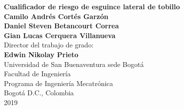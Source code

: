 \begin{center}
\thispagestyle{empty} \vspace*{0cm} \textbf{\huge
Cualificador de riesgo de esguince lateral de tobillo}\\[2.5cm]
\vspace*{1cm}
\Large\textbf{Camilo Andrés Cortés Garzón \\ Daniel Steven Betancourt Correa \\ Gian Lucas Cerquera Villanueva}\\[3.5cm]
\large{Director del trabajo de grado:}\\%
\large\textbf{Edwin Nikolay Prieto}\\[1.5cm]



\vspace*{2.5cm}
\Large{Universidad de San Buenaventura sede Bogotá}\\
\Large{Facultad de Ingeniería}\\
\Large{Programa de Ingeniería Mecatrónica}\\
\large{Bogotá D.C., Colombia\\
2019}\\
\end{center}


%
